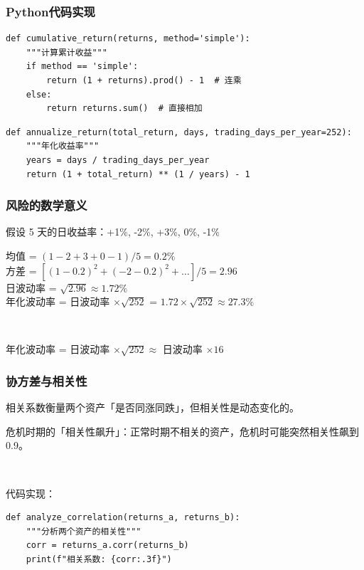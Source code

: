 \begin{frame}[fragile]
    \frametitle{Python代码实现}

    \begin{verbatim}
def cumulative_return(returns, method='simple'):
    """计算累计收益"""
    if method == 'simple':
        return (1 + returns).prod() - 1  # 连乘
    else:
        return returns.sum()  # 直接相加
    \end{verbatim}

    \begin{verbatim}
def annualize_return(total_return, days, trading_days_per_year=252):
    """年化收益率"""
    years = days / trading_days_per_year
    return (1 + total_return) ** (1 / years) - 1
    \end{verbatim}
\end{frame}

\begin{frame}[fragile]
    \frametitle{风险的数学意义}
    
    假设 5 天的日收益率：+1\%, -2\%, +3\%, 0\%, -1\%
    
    \hspace{2em} 均值 = $(1 - 2 + 3 + 0 - 1) / 5 = 0.2\%$ \\
    \hspace{2em} 方差 = $[(1-0.2)^2 + (-2-0.2)^2 + \dots ] / 5 = 2.96$ \\
    \hspace{2em} 日波动率 = $\sqrt{2.96}\approx 1.72\% $ \\
    \hspace{2em} 年化波动率 = 日波动率 $\times \sqrt{252}$ = $1.72 \times \sqrt{252} \approx 27.3\%$

    ~\par
    年化波动率 = 日波动率 $\times \sqrt{252} \approx$ 日波动率 $\times 16$
\end{frame}

\begin{frame}[fragile]
    \frametitle{协方差与相关性}

    相关系数衡量两个资产「是否同涨同跌」，但相关性是动态变化的。

    危机时期的「相关性飙升」：正常时期不相关的资产，危机时可能突然相关性飙到 0.9。

    ~\par
    代码实现：
    \begin{verbatim}
def analyze_correlation(returns_a, returns_b):
    """分析两个资产的相关性"""
    corr = returns_a.corr(returns_b)
    print(f"相关系数: {corr:.3f}")
    \end{verbatim}
\end{frame}

